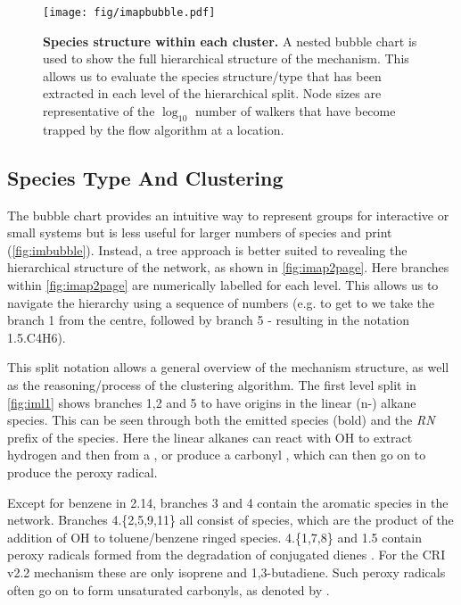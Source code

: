 \begin{figure}[H]
  \centering
  \texttt{[image: fig/imapbubble.pdf]}
  \caption{\textbf{Species structure within each cluster.} A nested bubble chart is used to show the full hierarchical structure of the mechanism. This allows us to evaluate the species structure/type that has been extracted in each level of the hierarchical split. Node sizes are representative of the $\log_{10}$ number of walkers that have become trapped by the flow algorithm at a location. }
    \label{fig:imbubble}
\end{figure}




\subsection{Species Type And Clustering}
The bubble chart provides an intuitive way to represent groups for interactive or small systems but is less useful for larger numbers of species and print (\autoref{fig:imbubble}). Instead, a tree approach is better suited to revealing the hierarchical structure of the network, as shown in \autoref{fig:imap2page}. Here branches within \autoref{fig:imap2page} are numerically labelled for each level. This allows us to navigate the hierarchy using a sequence of numbers (e.g. to get to  we take the branch 1 from the centre, followed by branch 5 - resulting in the notation 1.5.C4H6).

This split notation allows a general overview of the mechanism structure, as well as the reasoning/process of the clustering algorithm. The first level split in \autoref{fig:iml1} shows branches 1,2 and 5 to have origins in the linear (n-) alkane species. This can be seen through both the emitted species (bold) and the \emph{RN} prefix of the species. Here the linear alkanes can react with OH to extract hydrogen and then from a , or produce a carbonyl \emph{}, which can then go on to produce the \emph{} peroxy radical.

Except for benzene in 2.14, branches 3 and 4 contain the aromatic species in the network.  Branches 4.\{2,5,9,11\} all consist of \emph{} species, which are the product of the addition of OH to toluene/benzene ringed species. 4.\{1,7,8\} and 1.5 contain peroxy radicals formed from the degradation of conjugated dienes \emph{}. For the CRI v2.2 mechanism these are only isoprene and 1,3-butadiene. Such peroxy radicals often go on to form unsaturated carbonyls, as denoted by \emph{}.

